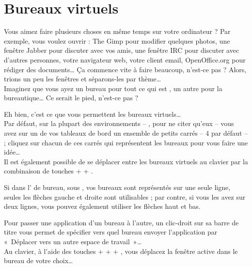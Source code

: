 \section{Bureaux virtuels}
\label{RefBureauxVirtuels}
Vous aimez faire plusieurs choses en même temps sur votre ordinateur ? Par exemple, vous voulez ouvrir : The Gimp pour modifier quelques photos, une fenêtre Jabber pour discuter avec vos amis, une fenêtre IRC pour discuter avec d'autres personnes, votre navigateur web, votre client email, OpenOffice.org pour rédiger des documents\ldots{} Ça commence vite à faire beaucoup, n'est-ce pas ?
Alors, trions un peu les fenêtres et séparons-les par thème\ldots{}\\
Imaginez que vous ayez un bureau pour tout ce qui est , un autre pour la bureautique… Ce serait le pied, n'est-ce pas ?\par
Eh bien, c'est ce que vous permettent les bureaux virtuels…\\
Par défaut, sur la plupart des environnements -- ,  pour ne citer qu'eux -- vous avez sur un de vos tableaux de bord un ensemble de petits carrés -- 4 par défaut -- ; cliquez sur chacun de ces carrés qui représentent les bureaux pour vous faire une idée\ldots{}\\
Il est également possible de se déplacer entre les bureaux virtuels au clavier par la combinaison de touches  +  + .\par
Si dans l' de bureau, sous , vos bureaux sont représentés sur une seule ligne, seules les flèches gauche et droite sont utilisables ; par contre, si vous les avez sur deux lignes, vous pouvez également utiliser les flèches haut et bas.\par
Pour passer une application d'un bureau à l'autre, un clic-droit sur sa barre de titre vous permet de spécifier vers quel bureau envoyer l'application par «~Déplacer vers un autre espace de travail~»\ldots{}\\
Au clavier, à l'aide des touches  +  +  + , vous déplacez la fenêtre active dans le bureau de votre choix\ldots{}

